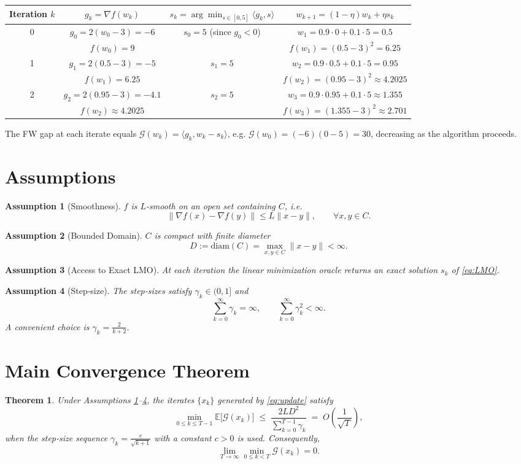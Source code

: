 \documentclass{article}
\newtheorem{theorem}{Theorem}
\newtheorem{assumption}{Assumption}
\newcommand{\gap}{\mathcal{G}}
\newcommand{\diam}{\mathrm{diam}}
\begin{document}
\begin{tabular}{c|c|c|c}
Iteration $k$ & $g_k=\nabla f(w_k)$ & $s_k=\arg\min_{s\in[0,5]}\langle g_k,s\rangle$ & $w_{k+1}=(1-\eta)w_k+\eta s_k$ \\ \hline
0 & $g_0 = 2(w_0-3)= -6$ & $s_0 = 5$ (since $g_0<0$) & $w_1 = 0.9\cdot0+0.1\cdot5=0.5$ \\ 
  & $f(w_0)=9$ &  & $f(w_1)=(0.5-3)^2=6.25$ \\ \hline
1 & $g_1 = 2(0.5-3)= -5$ & $s_1 = 5$ & $w_2 = 0.9\cdot0.5+0.1\cdot5 =0.95$ \\ 
  & $f(w_1)=6.25$ &  & $f(w_2)=(0.95-3)^2\approx4.2025$ \\ \hline
2 & $g_2 = 2(0.95-3)= -4.1$ & $s_2 = 5$ & $w_3 = 0.9\cdot0.95+0.1\cdot5 \approx1.355$ \\ 
  & $f(w_2)\approx4.2025$ &  & $f(w_3)=(1.355-3)^2\approx2.701$ 
\end{tabular}

The FW gap at each iterate equals $\gap(w_k)=\langle g_k, w_k-s_k\rangle$, e.g. $\gap(w_0)=(-6)(0-5)=30$, decreasing as the algorithm proceeds.

\section*{Assumptions}
\begin{assumption}[Smoothness]\label{asm:smooth}
$f$ is $L$‑smooth on an open set containing $C$, i.e.
\[
\|\nabla f(x)-\nabla f(y)\|\le L\|x-y\|,\qquad \forall x,y\in C .
\]
\end{assumption}
\begin{assumption}[Bounded Domain]\label{asm:bounded}
$C$ is compact with finite diameter
\[
D:=\diam(C)=\max_{x,y\in C}\|x-y\|<\infty .
\]
\end{assumption}
\begin{assumption}[Access to Exact LMO]\label{asm:lmo}
At each iteration the linear minimization oracle returns an exact solution $s_k$ of \eqref{eq:LMO}.
\end{assumption}
\begin{assumption}[Step‑size]\label{asm:stepsize}
The step‑sizes satisfy $\gamma_k\in(0,1]$ and
\[
\sum_{k=0}^{\infty}\gamma_k = \infty,\qquad
\sum_{k=0}^{\infty}\gamma_k^2 < \infty .
\]
A convenient choice is $\gamma_k = \frac{2}{k+2}$.
\end{assumption}

\section*{Main Convergence Theorem}
\begin{theorem}\label{thm:main}
Under Assumptions \ref{asm:smooth}–\ref{asm:stepsize}, the iterates $\{x_k\}$ generated by \eqref{eq:update} satisfy
\[
\min_{0\le k\le T-1}\mathbb{E}\big[\gap(x_k)\big]
   \;\le\; \frac{2L D^2}{\sum_{k=0}^{T-1}\gamma_k}
   \;=\; O\!\left(\frac{1}{\sqrt{T}}\right) ,
\]
when the step‑size sequence $\gamma_k = \frac{c}{\sqrt{k+1}}$ with a constant $c>0$ is used.
Consequently,
\[
\lim_{T\to\infty}\min_{0\le k<T}\gap(x_k)=0 .
\]
\end{theorem}
\end{document}
